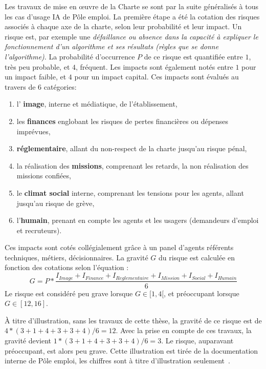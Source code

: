 Les travaux de mise en œuvre de la Charte se sont par la suite généralisés à tous les cas d’usage IA de Pôle emploi.
La première étape a été la cotation des risques associés à chaque axe de la charte, selon leur probabilité et leur impact. Un risque est, par exemple une \textit{défaillance ou absence dans la capacité à expliquer le fonctionnement d'un algorithme et ses résultats (règles que se donne l'algorithme)}.
La probabilité d'occurrence $P$ de ce risque est quantifiée entre $1$, très peu probable, et $4$, fréquent. Les impacts sont également notés entre $1$ pour un impact faible, et $4$ pour un impact capital. Ces impacts sont évalués au travers de $6$ catégories:
\begin{enumerate}
    \item l' \textbf{image}, interne et médiatique, de l'établissement,
    \item les \textbf{finances} englobant les risques de pertes financières ou dépenses imprévues,
    \item \textbf{réglementaire}, allant du non-respect de la charte jusqu'au risque pénal,
    \item la réalisation des \textbf{missions}, comprenant les retards, la non réalisation des missions confiées,
    \item le \textbf{climat social} interne, comprenant les tensions pour les agents, allant jusqu'au risque de grève,
    \item l'\textbf{humain}, prenant en compte les agents et les usagers (demandeurs d'emploi et recruteurs).
\end{enumerate}
Ces impacts sont cotés collégialement grâce à un panel d'agents référents techniques, métiers, décisionnaires. La gravité $G$ du risque est calculée en fonction des cotations selon l'équation :
\begin{equation}
    G = P * \frac{I_{Image} + I_{Finance} + I_{Reglementaire} + I_{Mission} + I_{Social} + I_{Humain}}{6}
\end{equation}
Le risque est considéré peu grave lorsque $G \in [1, 4[$, et préoccupant lorsque $G \in [12,16]$.


À titre d'illustration, sans les travaux de cette thèse, la gravité de ce risque est de $4* (3+1+4+3+3+4)/6 = 12 $.
Avec la prise en compte de ces travaux, la gravité devient $ 1* (3+1+4+3+3+4)/6 = 3 $. Le risque, auparavant préoccupant, est alors peu grave. Cette illustration est tirée de la documentation interne de Pôle emploi, les chiffres sont à titre d'illustration seulement~\cite{Pole2021}.

